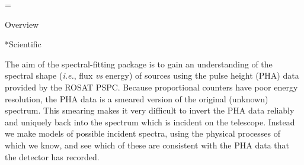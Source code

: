 =\pageno

\noindent
\@{Overview}

\**Scientific

The aim of the spectral-fitting package is to gain an understanding of the
spectral shape ({\it i.e.}, flux {\it vs} energy) of sources using the pulse
height (PHA) data provided by the ROSAT PSPC.  Because proportional counters have
poor energy resolution, the PHA data is a smeared version of the original
(unknown) spectrum.  This smearing makes it very difficult to invert the
PHA data reliably and uniquely back into the spectrum which
is incident on the telescope.  Instead
we make models of possible incident spectra, using the physical processes of which
we know, and see which of these are consistent with the PHA
data that the detector has recorded.


